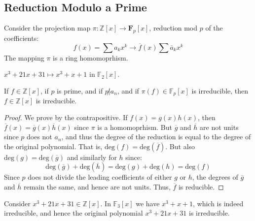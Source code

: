    \subsection{Reduction Modulo a Prime}
        Consider the projection map
        $\pi:\mathbb{Z}[x]\rightarrow\mathbf{F}_{p}[x]$, reduction mod $p$
        of the coefficients:
        \begin{equation}
            f(x)=\sum{a}_{k}x^{k}\longrightarrow
                \overline{f}(x)\sum\overline{a}_{k}x^{k}
        \end{equation}
        The mapping $\pi$ is a ring homomoprhism.
        \begin{example}
            $x^{3}+21x+31\mapsto{x}^{3}+x+1$ in $\mathbb{F}_{2}[x]$.
        \end{example}
        \begin{theorem}
            If $f\in\mathbb{Z}[x]$, if $p$ is prime, and if $p\not|a_{n}$,
            and if $\pi(f)\in\mathbb{F}_{p}[x]$ is irreducible, then
            $f\in\mathbb{Z}[x]$ is irreducible.
        \end{theorem}
        \begin{proof}
            We prove by the contrapositive. If $f(x)=g(x)h(x)$, then
            $\overline{f}(x)=\overline{g}(x)\overline{h}(x)$ since $\pi$ is
            a homomoprhism. But $\overline{g}$ and $\overline{h}$ are not
            units since $p$ does not $a_{n}$, and thus the degree of the
            reduction is equal to the degree of the original polynomial.
            That is, $\textrm{deg}(f)=\textrm{deg}(\overline{f})$. But also
            $\textrm{deg}(g)=\textrm{deg}(\overline{g})$ and similarly for
            $h$ since:
            \begin{equation}
                \textrm{deg}(\overline{g})+\textrm{deg}(\overline{h})
                =\textrm{deg}(g)+\textrm{deg}(h)=\textrm{deg}(f)
            \end{equation}
            Since $p$ does not divide the leading coefficients of either
            $g$ or $h$, the degrees of $\overline{g}$ and $\overline{h}$
            remain the same, and hence are not units. Thus, $\overline{f}$
            is reducible.
        \end{proof}
        \begin{example}
            Consider $x^{3}+21x+31\in\mathbb{Z}[x]$. In $\mathbb{F}_{3}[x]$
            we have $x^{3}+x+1$, which is indeed irreducible, and hence
            the original polynomial $x^{3}+21x+31$ is irreducible.
        \end{example}
